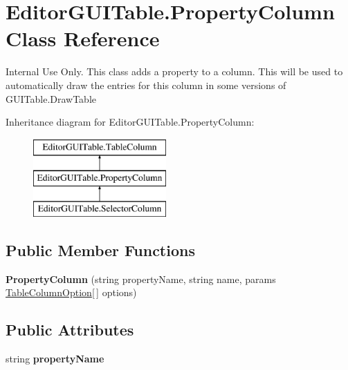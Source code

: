 \hypertarget{class_editor_g_u_i_table_1_1_property_column}{}\section{Editor\+G\+U\+I\+Table.\+Property\+Column Class Reference}
\label{class_editor_g_u_i_table_1_1_property_column}


Internal Use Only. This class adds a property to a column. This will be used to automatically draw the entries for this column in some versions of G\+U\+I\+Table.\+Draw\+Table  


Inheritance diagram for Editor\+G\+U\+I\+Table.\+Property\+Column\+:\begin{figure}[H]
\begin{center}
\leavevmode
\includegraphics[height=3.000000cm]{class_editor_g_u_i_table_1_1_property_column}
\end{center}
\end{figure}
\subsection*{Public Member Functions}
\begin{DoxyCompactItemize}
\item 
\mbox{\label{class_editor_g_u_i_table_1_1_property_column_a26dacbd8bb1ace402c8a30857cf72b0d}} 
{\bfseries Property\+Column} (string property\+Name, string name, params \mbox{\hyperlink{class_table_column_option}{Table\+Column\+Option}}\mbox{[}$\,$\mbox{]} options)
\end{DoxyCompactItemize}
\subsection*{Public Attributes}
\begin{DoxyCompactItemize}
\item 
\mbox{\label{class_editor_g_u_i_table_1_1_property_column_ad1b1137a273befe15ba5025ad8f4aa3e}} 
string {\bfseries property\+Name}
\end{DoxyCompactItemize}
